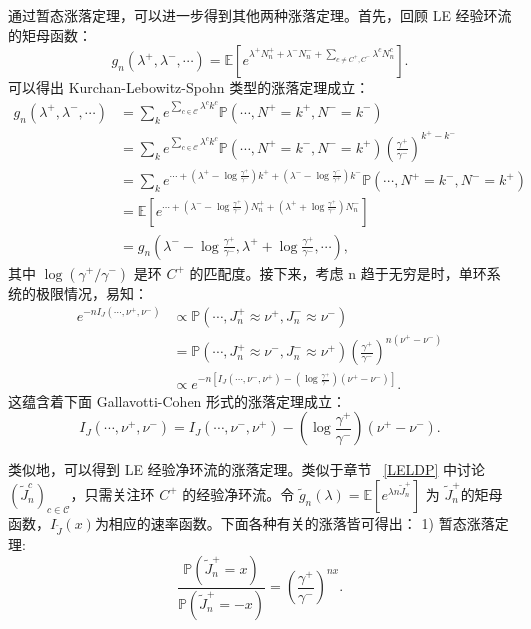 通过暂态涨落定理，可以进一步得到其他两种涨落定理。首先，回顾 LE 经验环流的矩母函数：
\begin{equation*}
    g_n(\lambda^+,\lambda^-,\cdots)
    = \mathbb{E}\left[e^{\lambda^+N^+_n+\lambda^-N^-_n+\sum_{c\neq C^+,C^-}\lambda^cN^c_n}\right].
\end{equation*}
可以得出 Kurchan-Lebowitz-Spohn 类型的涨落定理成立：
\begin{align*}
    g_n(\lambda^+,\lambda^-,\cdots)
    &= \sum_{k}e^{\sum_{c\in\mathcal{C}}\lambda^ck^c}\mathbb{P}\left(\cdots,N^+=k^+,N^-=k^-\right)\\
    &= \sum_{k}e^{\sum_{c\in\mathcal{C}}\lambda^ck^c}
    \mathbb{P}\left(\cdots,N^+=k^-,N^-=k^+\right)\left(\frac{\gamma^+}{\gamma^-}\right)^{k^+-k^-}\\
    &= \sum_{k}e^{\cdots+\left(\lambda^+-\log\frac{\gamma^+}{\gamma^-}\right)k^++
    \left(\lambda^--\log\frac{\gamma^-}{\gamma^+}\right)k^-}\mathbb{P}(\cdots,N^+=k^-,N^-=k^+)\\
    &= \mathbb{E}\left[e^{\cdots+\left(\lambda^--\log\frac{\gamma^+}{\gamma^-}\right)N^+_n+
    \left(\lambda^++\log\frac{\gamma^+}{\gamma^-}\right)N^-_n}\right]\\
    &= g_n\left(\lambda^--\log\frac{\gamma^+}{\gamma^-},
    \lambda^++\log\frac{\gamma^+}{\gamma^-},\cdots\right),
\end{align*}
其中 $\log(\gamma^+/\gamma^-)$ 是环 $C^+$ 的匹配度。接下来，考虑 n 趋于无穷是时，单环系统的极限情况，易知：
\begin{align*}
e^{-nI_J(\cdots,\nu^+,\nu^-)}
&\propto \mathbb{P}\left(\cdots,J^+_n\approx\nu^+,J^-_n\approx\nu^-\right)\\
&= \mathbb{P}\left(\cdots,J^+_n\approx\nu^-,J^-_n\approx\nu^+\right)
\left(\frac{\gamma^+}{\gamma^-}\right)^{n(\nu^+-\nu^-)}\\
&\propto e^{-n\left[I_J(\cdots,\nu^-,\nu^+)-\left(\log\frac{\gamma^+}{\gamma^-}\right)
(\nu^+-\nu^-)\right]}.
\end{align*}
这蕴含着下面 Gallavotti-Cohen 形式的涨落定理成立：
\begin{equation}\label{G-C type fluctuation}
    I_J(\cdots,\nu^+,\nu^-)=I_J(\cdots,\nu^-,\nu^+)-\left(\log\frac{\gamma^+}{\gamma^-}\right)(\nu^+-\nu^-).
\end{equation}

类似地，可以得到 LE 经验净环流的涨落定理。类似于章节 ~\ref{LELDP} 中讨论 $(\tilde{J}^c_n)_{c\in\mathcal{C}}$，只需关注环 $C^+$ 的经验净环流。令
$\tilde{g}_n(\lambda) = \mathbb{E}[e^{\lambda n\tilde{J}^+_n}]$ 为 $\tilde{J}^+_n$的矩母函数，$I_{\tilde{J}}(x)$为相应的速率函数。下面各种有关的涨落皆可得出：
1) 暂态涨落定理:
\begin{equation*}
\frac{\mathbb{P}(\tilde{J}^+_n=x)}{\mathbb{P}(\tilde{J}^+_n=-x)}
= \left(\frac{\gamma^+}{\gamma^-}\right)^{nx}.
\end{equation*}

